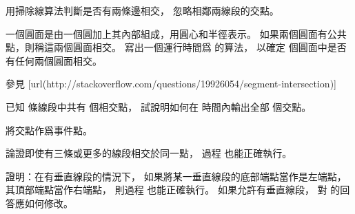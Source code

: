 \startANSWER
用掃除線算法判斷是否有兩條邊相交，
忽略相鄰兩線段的交點。
\stopANSWER

\startEXERCISE
一個圓面是由一個圓加上其內部組成，用圓心和半徑表示。
如果兩個圓面有公共點，則稱這兩個圓面相交。
寫出一個運行時間爲  的算法，
以確定  個圓面中是否有任何兩個圓面相交。
\stopEXERCISE

\startANSWER
參見
[url(http://stackoverflow.com/questions/19926054/segment-intersection)]

\stopANSWER

\startEXERCISE
已知  條線段中共有  個相交點，
試說明如何在  時間內輸出全部  個交點。
\stopEXERCISE

\startANSWER
將交點作爲事件點。
\stopANSWER

\startEXERCISE
論證即使有三條或更多的線段相交於同一點，
過程  也能正確執行。
\stopEXERCISE

\startANSWER
{}
\stopANSWER

\startEXERCISE
證明：在有垂直線段的情況下，
如果將某一垂直線段的底部端點當作是左端點，
其頂部端點當作右端點，
則過程  也能正確執行。
如果允許有垂直線段，
對 的回答應如何修改。
\stopEXERCISE

\startANSWER
{}
\stopANSWER

\stopsection

